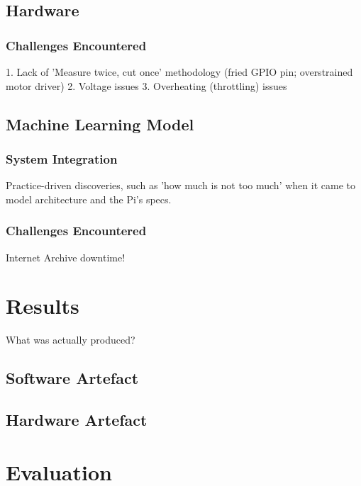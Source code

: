       \subsection{Hardware}
          \subsubsection{Challenges Encountered}
              1. Lack of 'Measure twice, cut once' methodology (fried GPIO pin; overstrained motor driver)
              2. Voltage issues
              3. Overheating (throttling) issues
    
      \subsection{Machine Learning Model}
          \subsubsection{System Integration}
              Practice-driven discoveries, such as 'how much is not too much' when it came to model architecture and the Pi's specs.
    
          \subsubsection{Challenges Encountered}
              Internet Archive downtime!
    
    
    \section{Results} %
      What was actually produced?
      \subsection{Software Artefact}
    
      \subsection{Hardware Artefact}
    
    \section{Evaluation}
